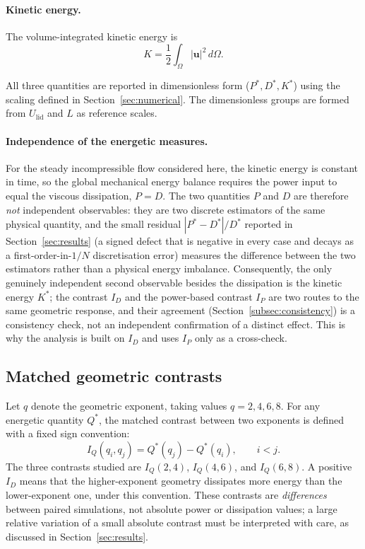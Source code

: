 \paragraph{Kinetic energy.}
The volume-integrated kinetic energy is
\begin{equation}
K = \frac{1}{2}\int_{\Omega} |\mathbf{u}|^2\, d\Omega.
\end{equation}

All three quantities are reported in dimensionless form ($P^*,D^*,K^*$) using the scaling defined in Section~\ref{sec:numerical}. The dimensionless groups are formed from $U_{\mathrm{lid}}$ and $L$ as reference scales.

\paragraph{Independence of the energetic measures.}
For the steady incompressible flow considered here, the kinetic energy is constant in time, so the global mechanical energy balance requires the power input to equal the viscous dissipation, $P=D$. The two quantities $P$ and $D$ are therefore \emph{not} independent observables: they are two discrete estimators of the same physical quantity, and the small residual $|P^*-D^*|/D^*$ reported in Section~\ref{sec:results} (a signed defect that is negative in every case and decays as a first-order-in-$1/N$ discretisation error) measures the difference between the two estimators rather than a physical energy imbalance. Consequently, the only genuinely independent second observable besides the dissipation is the kinetic energy $K^*$; the contrast $I_D$ and the power-based contrast $I_P$ are two routes to the same geometric response, and their agreement (Section~\ref{subsec:consistency}) is a consistency check, not an independent confirmation of a distinct effect. This is why the analysis is built on $I_D$ and uses $I_P$ only as a cross-check.

\subsection{Matched geometric contrasts}
\label{subsec:contrasts}

Let $q$ denote the geometric exponent, taking values $q=2,4,6,8$. For any energetic quantity $Q^*$, the matched contrast between two exponents is defined with a fixed sign convention:
\begin{equation}
I_Q(q_i,q_j) = Q^*(q_j) - Q^*(q_i), \qquad i<j.
\label{eq:contrast}
\end{equation}
The three contrasts studied are $I_Q(2,4)$, $I_Q(4,6)$, and $I_Q(6,8)$. A positive $I_D$ means that the higher-exponent geometry dissipates more energy than the lower-exponent one, under this convention. These contrasts are \emph{differences} between paired simulations, not absolute power or dissipation values; a large relative variation of a small absolute contrast must be interpreted with care, as discussed in Section~\ref{sec:results}.

